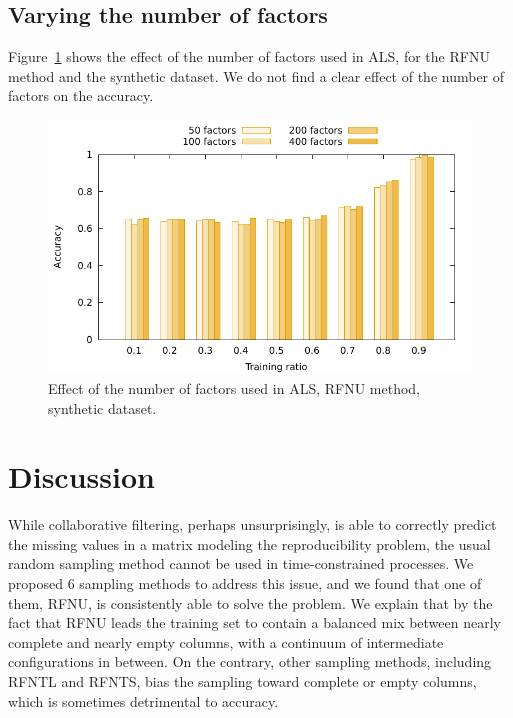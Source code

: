 \documentclass[10pt, conference, compsocconf]{IEEEtran}
\newcommand{\todo}[1]{\marginpar{\parbox{18mm}{\flushleft\tiny\color{red}\textbf{TODO}:
      #1}}}
\begin{document}
\subsection{Varying the number of factors}
Figure~\ref{fig:factors} shows the effect of the number of factors used 
in ALS, for the RFNU method and the synthetic dataset. We do not find a 
clear effect of the number of factors on the accuracy.

\begin{figure}
\includegraphics[width=\columnwidth]{data/results/means_of_results/ALS/Synthetic/8type-RFNU-Differ-Num-Factors/ALS-8-types-ranks.pdf}
\caption{Effect of the number of factors used in ALS, RFNU method, synthetic dataset.}
\label{fig:factors}
\end{figure}

\section{Discussion}

While collaborative filtering, perhaps unsurprisingly, is able to 
correctly predict the missing values in a matrix modeling the 
reproducibility problem, the usual random sampling method cannot be 
used in time-constrained processes. We proposed 6 sampling methods to 
address this issue, and we found that one of them, RFNU, \todo{check 
that} is consistently able to solve the problem. We explain that by 
the fact that RFNU leads the training set to contain a balanced mix 
between nearly complete and nearly empty columns, with a continuum of 
intermediate configurations in between. On the contrary, other sampling 
methods, including RFNTL and RFNTS, bias the sampling toward complete 
or empty columns, which is sometimes detrimental to accuracy.
\end{document}
